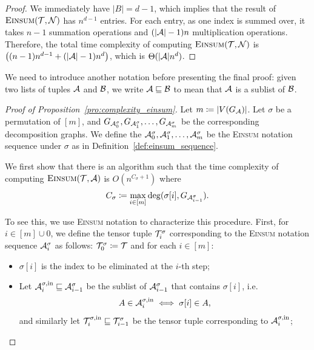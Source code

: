 \documentclass[letterpaper,11pt]{article}
\def\Einsum{\textsc{Einsum}}
\newcommand{\tensorcontraction}{\textsc{Einsum}}
\newcommand{\degp}[2]{\deg(#1,#2)}
\newcommand{\verticesp}[1]{V(#1)}
\newcommand{\graphform}[1]{G_{#1}}
\newcommand{\less}{O}
\newcommand{\appequal}{\Theta}
\begin{document}
\begin{bibunit}[plainnat]
\begin{proof}
We immediately have $|B| = d - 1$, which implies that the result of $\tensorcontraction(\calT, \calN)$ has $n^{d-1}$ entries. For each entry, as one index is summed over, it takes $n-1$ summation operations and $(|{\mathcal{A}}|-1)n$ multiplication operations. Therefore, the total time complexity of computing $\tensorcontraction(\calT, \calN)$ is $\big((n-1)n^{d-1} + (|{\mathcal{A}}|-1)n^d\big)$, which is $\appequal(|\calA|n^{d})$. 
\end{proof}

We need to introduce another notation before presenting the final proof: given two lists of tuples ${\mathcal{A}}$ and ${\mathcal{B}}$, we write ${\mathcal{A}} \sqsubseteq {\mathcal{B}}$ to mean that ${\mathcal{A}}$ is a sublist of ${\mathcal{B}}$.

\begin{proof}[Proof of Proposition~\ref{pro:complexity_einsum}]    
Let $m \coloneqq |\verticesp{G_\calA}|$. Let $\sigma$ be a permutation of $[m]$, and $\graphform{\calA^{\sigma}_0}, \graphform{\calA^{\sigma}_1}, \ldots, \graphform{\calA^{\sigma}_m}$ be the corresponding decomposition graphs. We define the ${\mathcal{A}}^{\sigma}_0, {\mathcal{A}}^{\sigma}_1, \ldots, {\mathcal{A}}^{\sigma}_m$ be the \Einsum{} notation sequence under $\sigma$ as in Definition~\ref{def:einsum_sequence}.
    
We first show that there is an algorithm such that the time complexity of computing $\tensorcontraction(\calT, \calA)$ is $\less(n^{C_\sigma + 1}) $ where
\begin{equation*}
C_\sigma \coloneqq \max_{i \in [m]} \degp{\sigma[i]}{\graphform{\calA^{\sigma}_{i-1}}}.
\end{equation*}

To see this, we use \Einsum{} notation to characterize this procedure. First, for $i \in [m] \cup {0}$, we define the tensor tuple ${\mathcal{T}}^\sigma_i$ corresponding to the \Einsum{} notation sequence ${\mathcal{A}}^\sigma_i$ as follows: ${\mathcal{T}}^{\sigma}_{0} \coloneqq {\mathcal{T}}$ and for each $i \in [m]$:
\begin{itemize}
    \item $\sigma[i]$ is the index to be eliminated at the $i$-th step;
    \item Let ${\mathcal{A}}^{\sigma, \mathrm{in}}_i \sqsubseteq {\mathcal{A}}^{\sigma}_{i-1}$ be the sublist of ${\mathcal{A}}^{\sigma}_{i-1}$ that contains $\sigma[i]$, i.e.
    \begin{align*}
    A \in {\mathcal{A}}^{\sigma, \mathrm{in}}_i \iff \sigma[i] \in A,
    \end{align*}
    and similarly let ${\mathcal{T}}^{\sigma, \mathrm{in}}_i \sqsubseteq {\mathcal{T}}^{\sigma}_{i-1}$ be the tensor tuple corresponding to ${\mathcal{A}}^{\sigma, \mathrm{in}}_i $;
    

\end{itemize}
\end{proof}
\end{bibunit}
\end{document}
